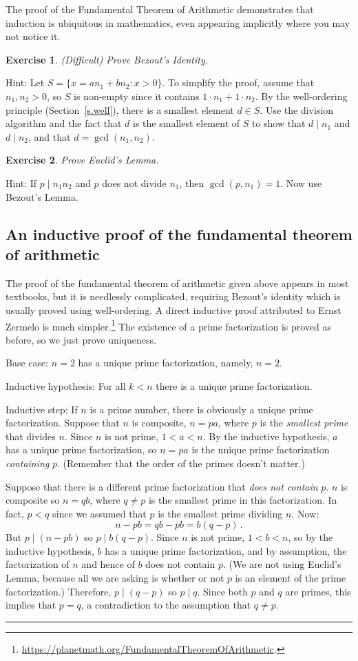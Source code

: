 \documentclass[11pt,a4paper]{report}
\newcommand*{\qed}{\hfill\rule{1ex}{1.5ex}}
\newtheorem{exercise}{Exercise}
\begin{document}
The proof of the Fundamental Theorem of Arithmetic demonstrates that induction is ubiquitous in mathematics, even appearing implicitly where you may not notice it.

\begin{exercise}
(Difficult) Prove Bezout's Identity.
\end{exercise}
Hint: Let $S=\{x = an_1+bn_2: x>0\}$. To simplify the proof, assume that $n_1,n_2>0$, so $S$ is non-empty since it contains $1\cdot n_1+1\cdot n_2$. By the well-ordering principle (Section~\ref{s.well}), there is a smallest element $d\in S$. Use the division algorithm and the fact that $d$ is the smallest element of $S$ to show that $d\mid n_1$ and $d\mid n_2$, and that $d=\gcd(n_1,n_2)$.

\begin{exercise}
Prove Euclid's Lemma.
\end{exercise}
Hint: If $p\mid n_1n_2$ and $p$ does not divide $n_1$, then $\gcd(p,n_1)=1$. Now use Bezout's Lemma.

\subsection*{An inductive proof of the fundamental theorem of arithmetic}

The proof of the fundamental theorem of arithmetic given above appears in most textbooks, but it is needlessly complicated, requiring Bezout's identity which is usually proved using well-ordering. A direct inductive proof attributed to Ernst Zermelo is much simpler.\footnote{\url{https://planetmath.org/FundamentalTheoremOfArithmetic}.} The existence of a prime factorization is proved as before, so we just prove uniqueness.

Base case: $n=2$ has a unique prime factorization, namely, $n=2$. 

Inductive hypothesis: For all $k<n$ there is a unique prime factorization.

Inductive step: If $n$ is a prime number, there is obviously a unique prime factorization. Suppose that $n$ is composite, $n=pa$, where $p$ is the \emph{smallest prime} that divides $n$. Since $n$ is not prime, $1<a<n$. By the inductive hypothesis, $a$ has a unique prime factorization, so $n=pa$ is the unique prime factorization \emph{containing} $p$. (Remember that the order of the primes doesn't matter.)

Suppose that there is a different prime factorization that \emph{does not contain} $p$. $n$ is composite so $n=qb$, where $q\neq p$ is the smallest prime in this factorization. In fact, $p<q$ since we assumed that $p$ is the smallest prime dividing $n$. Now:
\[
n - pb = qb - pb = b(q-p)\,.
\]
But $p\mid (n-pb)$ so $p\mid b(q-p)$.  Since $n$ is not prime, $1<b<n$, so by the inductive hypothesis, $b$ has a unique prime factorization, and by assumption, the factorization of $n$ and hence of $b$ does not contain $p$. (We are not using Euclid's Lemma, because all we are asking is whether or not $p$ is an element of the prime factorization.) Therefore, $p\mid(q-p)$ so $p\mid q$. Since both $p$ and $q$ are primes, this implies that $p=q$, a contradiction to the assumption that $q\neq p$.\qed
\end{document}
